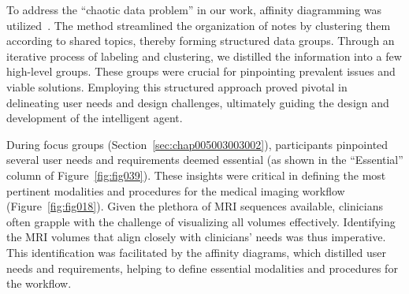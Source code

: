 \vspace{0.05mm}

\textcolor{revised}{To address the ``chaotic data problem'' in our work, affinity diagramming was utilized~\cite{harrington2016affinity}.
The method streamlined the organization of notes by clustering them according to shared topics, thereby forming structured data groups.
Through an iterative process of labeling and clustering, we distilled the information into a few high-level groups.
These groups were crucial for pinpointing prevalent issues and viable solutions.
Employing this structured approach proved pivotal in delineating user needs and design challenges, ultimately guiding the design and development of the intelligent agent.}

\textcolor{revised}{During focus groups (Section~\ref{sec:chap005003003002}), participants pinpointed several user needs and requirements deemed essential (as shown in the ``Essential'' column of Figure~\ref{fig:fig039}).
These insights were critical in defining the most pertinent modalities and procedures for the medical imaging workflow (Figure~\ref{fig:fig018}).
Given the plethora of \ac{MRI} sequences available, clinicians often grapple with the challenge of visualizing all volumes effectively.
Identifying the \ac{MRI} volumes that align closely with clinicians' needs was thus imperative.
This identification was facilitated by the affinity diagrams, which distilled user needs and requirements, helping to define essential modalities and procedures for the workflow.}


